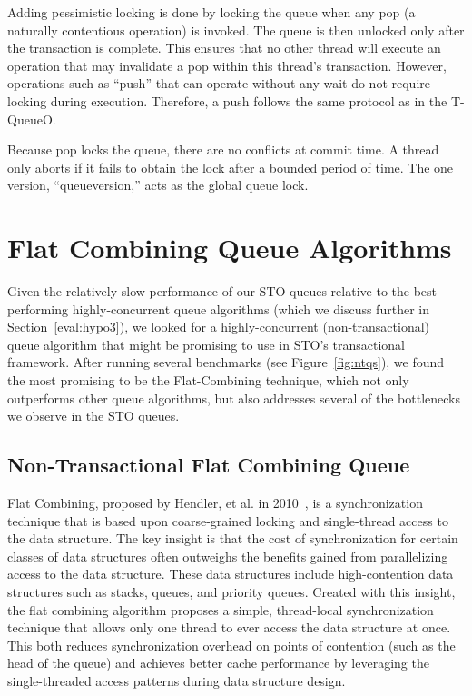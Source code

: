 Adding pessimistic locking is done by locking the queue when any pop (a naturally contentious operation) is invoked. The queue is then unlocked only after the transaction is complete. This ensures that no other thread will execute an operation that may invalidate a pop within this thread's transaction. However, operations such as ``push'' that can operate without any wait do not require locking during execution. Therefore, a push follows the same protocol as in the T-QueueO.

Because pop locks the queue, there are no conflicts at commit time. A thread only aborts if it fails to obtain the lock after a bounded period of time. The one version, “queueversion,” acts as the global queue lock. 


\section{Flat Combining Queue Algorithms}
Given the relatively slow performance of our STO queues relative to the best-performing highly-concurrent queue algorithms (which we discuss further in Section~\ref{eval:hypo3}), we looked for a highly-concurrent (non-transactional) queue algorithm that might be promising to use in STO's transactional framework. After running several benchmarks (see Figure~\ref{fig:ntqs}), we found the most promising to be the Flat-Combining technique, which not only outperforms other queue algorithms, but also addresses several of the bottlenecks we observe in the STO queues.

\subsection{Non-Transactional Flat Combining Queue}
\label{fcqueuent}

Flat Combining, proposed by Hendler, et al. in 2010~\cite{flatcombining}, is a synchronization technique that is based upon coarse-grained locking and single-thread access to the data structure. The key insight is that the cost of synchronization for certain classes of data structures often outweighs the benefits gained from parallelizing access to the data structure. These data structures include high-contention data structures such as stacks, queues, and priority queues. Created with this insight, the flat combining algorithm proposes a simple, thread-local synchronization technique that allows only one thread to ever access the data structure at once. This both reduces synchronization overhead on points of contention (such as the head of the queue) and achieves better cache performance by leveraging the single-threaded access patterns during data structure design.

